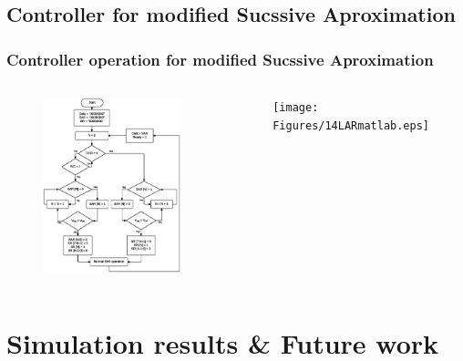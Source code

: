 \documentclass{beamer}
\begin{document}
\subsection*{Controller for modified Sucssive Aproximation}
\begin{frame}
	\frametitle{Controller operation for modified Sucssive Aproximation } \footnotesize
	\begin{center}
		\begin{columns}[c]
		\column{2.5 in}
			\begin{center}
				\begin{figure}
					\includegraphics[width=5.5 cm,height=6 cm,angle=360]{Figures/11LARsig.ps}
				\end{figure}
				\scriptsize{ \color{blue}{Controller for modified Sucssive Aproximation }}
			\end{center}

		\column{2.5 in}
			\begin{center}
				\begin{figure}
					\texttt{[image: Figures/14LARmatlab.eps]}
				\end{figure}
				\scriptsize{ \color{blue}{Number of clock cycles needed for conversion}}
			\end{center}
		\end{columns}
	\end{center}
\end{frame}
\section{Simulation results \& Future work}
\end{document}
